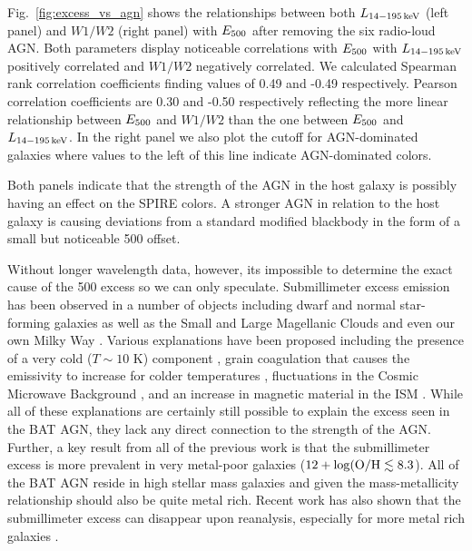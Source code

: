 Fig.~\ref{fig:excess_vs_agn} shows the relationships between both $L_{\rm 14-195\,keV}$ (left panel) and $W1/W2$ (right panel) with $E_{\rm 500}$ after removing the six radio-loud AGN. Both parameters display noticeable correlations with $E_{\rm 500}$ with $L_{\rm 14-195\,keV}$ positively correlated and $W1/W2$ negatively correlated. We calculated Spearman rank correlation coefficients finding values of 0.49 and -0.49 respectively. Pearson correlation coefficients are 0.30 and -0.50 respectively reflecting the more linear relationship between $E_{\rm 500}$ and $W1/W2$ than the one between $E_{\rm 500}$ and $L_{\rm 14-195\,keV}$. In the right panel we also plot the \citet{Stern:2012mz} cutoff for AGN-dominated galaxies where values to the left of this line indicate AGN-dominated colors. 

Both panels indicate that the strength of the AGN in the host galaxy is possibly having an effect on the SPIRE colors. A stronger AGN in relation to the host galaxy is causing deviations from a standard modified blackbody in the form of a small but noticeable 500 \um{} offset.

Without longer wavelength data, however, its impossible to determine the exact cause of the 500 \um{} excess so we can only speculate. Submillimeter excess emission has been observed in a number of objects including dwarf and normal star-forming galaxies \citep[e.g.][]{Galametz:2009cl,Galametz:2011ao,Dale:2012dq,Remy-Ruyer:2013kx} as well as the Small and Large Magellanic Clouds \citep{Bot:2010zm,Gordon:2010ix} and even our own Milky Way \citep{Paradis:2012oj}. Various explanations have been proposed including the presence of a very cold ($T \sim 10$ K) component \citep{Galametz:2009cl,Galametz:2011ao,OHalloran:2010wt}, grain coagulation that causes the emissivity to increase for colder temperatures \citep{Paradis:2009hb}, fluctuations in the Cosmic Microwave Background \citep{Planck-Collaboration:2011uk}, and an increase in magnetic material in the ISM \citep{Draine:2012vf}. While all of these explanations are certainly still possible to explain the excess seen in the BAT AGN, they lack any direct connection to the strength of the AGN. Further, a key result from all of the previous work is that the submillimeter excess is more prevalent in very metal-poor galaxies ($12 + \log(\rm{O/H} \lesssim 8.3$). All of the BAT AGN reside in high stellar mass galaxies \citep{Koss:2011vn} and given the mass-metallicity relationship \cite{Tremonti:2004fq} should also be quite metal rich. Recent work has also shown that the submillimeter excess can disappear upon reanalysis, especially for more metal rich galaxies \citep{Kirkpatrick:2013wq}.


